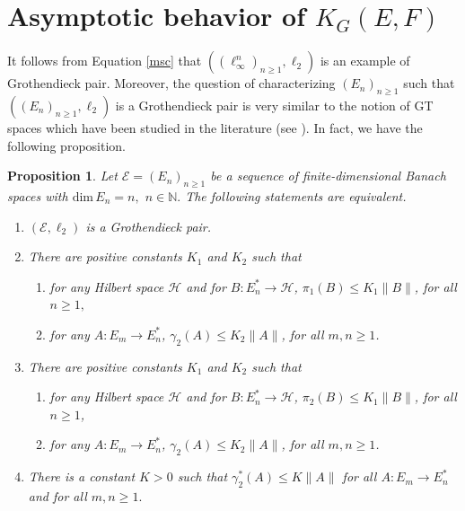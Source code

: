 \documentclass[a4paper,oneside,11pt, reqno]{amsart}
\numberwithin{equation}{section}
\newtheorem{proposition}[theorem]{Proposition}
\theoremstyle{plain}
\begin{document}
\section{Asymptotic behavior of $K_G(E,F)$}
It follows from Equation \eqref{msc} that $\left((\ell_\infty^n)_{n\geqslant 1},\ell_2\right)$ is an example of Grothendieck pair. Moreover, the question of characterizing $(E_n)_{n\geqslant 1}$ such that $\left((E_n)_{n\geqslant 1},\ell_2\right)$ is a Grothendieck pair is very similar to the notion of GT spaces which have been studied in the literature (see \cite{Pisier-factorization}).  In fact, we have the following proposition.

\begin{proposition}\label{originalgt} Let $\mathcal{E}=(E_n)_{n\geqslant 1}$ be a sequence of finite-dimensional Banach spaces with $\text{dim}\, E_n=n,$ $n\in\mathbb{N}.$
The following statements are equivalent. 
\begin{enumerate}
\item[(1)] $(\mathcal{E}, \ell_2)$ is a { Grothendieck pair}.
\item[(2)] There are positive constants $K_1$ and $K_2$ such that 
\begin{enumerate}
\item[(i)] for any Hilbert space $\mathcal H$ and for $B:E_n^*\to \mathcal{H}$,  
$\pi_1(B)\leqslant K_1\|B\|$, for all $n \geqslant 1,$ 
\item[(ii)] for any $A:E_m\to E_n^*$, 
$\gamma_2(A)\leqslant K_2\|A\|$, for all $m,n \geqslant 1$.
\end{enumerate}
\item[(3)] There are positive constants $K_1$ and $K_2$ such that 
\begin{enumerate}
\item[(i)] for any Hilbert space $\mathcal H$ and for $B:E_n^*\to \mathcal{H}$,  
$\pi_2(B)\leqslant K_1\|B\|$, for all $n \geqslant 1$, 
\item[(ii)] for any $A:E_m\to E_n^*$, 
$\gamma_2(A)\leqslant K_2\|A\|$, for all $m,n \geqslant 1$.
\end{enumerate}
\item[(4)] There is a constant $K>0$ such that  $\gamma_2^*(A)\leqslant K\|A\|$ for all $A:E_m\to E_n^*$ and for all $m,n\geqslant 1.$
\end{enumerate}
\end{proposition}
\end{document}
